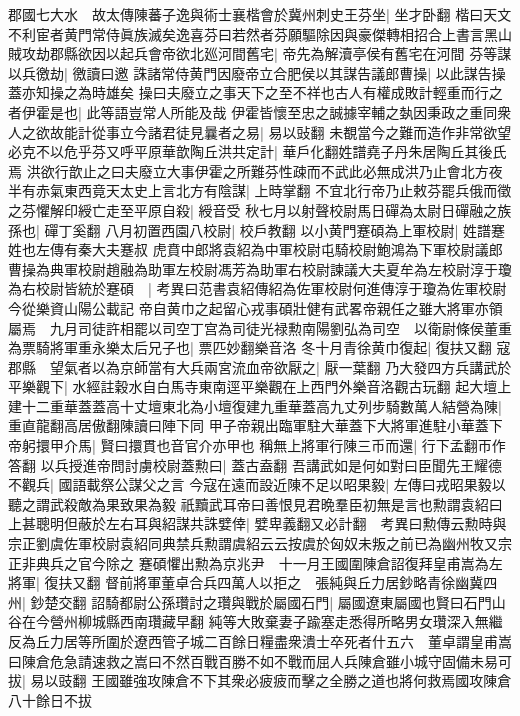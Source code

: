 郡國七大水　故太傳陳蕃子逸與術士襄楷會於冀州刺史王芬坐|{
	坐才卧翻}
楷曰天文不利宦者黄門常侍眞族滅矣逸喜芬曰若然者芬願驅除因與豪傑轉相招合上書言黑山賊攻劫郡縣欲因以起兵會帝欲北廵河間舊宅|{
	帝先為解瀆亭侯有舊宅在河間}
芬等謀以兵徼劫|{
	徼讀曰邀}
誅諸常侍黄門因廢帝立合肥侯以其謀告議郎曹操|{
	以此謀告操蓋亦知操之為時雄矣}
操曰夫廢立之事天下之至不祥也古人有權成敗計輕重而行之者伊霍是也|{
	此等語豈常人所能及哉}
伊霍皆懷至忠之誠據宰輔之埶因秉政之重同衆人之欲故能計從事立今諸君徒見曩者之易|{
	易以䜴翻}
未覩當今之難而造作非常欲望必克不以危乎芬又呼平原華歆陶丘洪共定計|{
	華戶化翻姓譜堯子丹朱居陶丘其後氏焉}
洪欲行歆止之曰夫廢立大事伊霍之所難芬性疎而不武此必無成洪乃止會北方夜半有赤氣東西竟天太史上言北方有陰謀|{
	上時掌翻}
不宜北行帝乃止敕芬罷兵俄而徵之芬懼解印綬亡走至平原自殺|{
	綬音受}
秋七月以射聲校尉馬日磾為太尉日磾融之族孫也|{
	磾丁奚翻}
八月初置西園八校尉|{
	校戶教翻}
以小黄門蹇碩為上軍校尉|{
	姓譜蹇姓也左傳有秦大夫蹇叔}
虎賁中郎將袁紹為中軍校尉屯騎校尉鮑鴻為下軍校尉議郎曹操為典軍校尉趙融為助軍左校尉馮芳為助軍右校尉諫議大夫夏牟為左校尉淳于瓊為右校尉皆統於蹇碩　|{
	考異曰范書袁紹傳紹為佐軍校尉何進傳淳于瓊為佐軍校尉今從樂資山陽公載記}
帝自黄巾之起留心戎事碩壯健有武畧帝親任之雖大將軍亦領屬焉　九月司徒許相罷以司空丁宫為司徒光禄勲南陽劉弘為司空　以衛尉條侯董重為票騎將軍重永樂太后兄子也|{
	票匹妙翻樂音洛}
冬十月青徐黄巾復起|{
	復扶又翻}
寇郡縣　望氣者以為京師當有大兵兩宮流血帝欲厭之|{
	厭一葉翻}
乃大發四方兵講武於平樂觀下|{
	水經註穀水自白馬寺東南逕平樂觀在上西門外樂音洛觀古玩翻}
起大壇上建十二重華蓋蓋高十丈壇東北為小壇復建九重華蓋高九丈列步騎數萬人結營為陳|{
	重直龍翻高居傲翻陳讀曰陣下同}
甲子帝親出臨軍駐大華蓋下大將軍進駐小華蓋下帝躬擐甲介馬|{
	賢曰擐貫也音官介亦甲也}
稱無上將軍行陳三币而還|{
	行下孟翻帀作答翻}
以兵授進帝問討虜校尉蓋勲曰|{
	蓋古盍翻}
吾講武如是何如對曰臣聞先王耀德不觀兵|{
	國語載祭公謀父之言}
今寇在遠而設近陳不足以昭果毅|{
	左傳曰戎昭果毅以聽之謂武殺敵為果致果為毅}
祇黷武耳帝曰善恨見君晩羣臣初無是言也勲謂袁紹曰上甚聰明但蔽於左右耳與紹謀共誅嬖倖|{
	嬖卑義翻又必計翻　考異曰勲傳云勲時與宗正劉虞佐軍校尉袁紹同典禁兵勲謂虞紹云云按虞於匈奴未叛之前已為幽州牧又宗正非典兵之官今除之}
蹇碩懼出勲為京兆尹　十一月王國圍陳倉詔復拜皇甫嵩為左將軍|{
	復扶又翻}
督前將軍董卓合兵四萬人以拒之　張純與丘力居鈔略青徐幽冀四州|{
	鈔楚交翻}
詔騎都尉公孫瓚討之瓚與戰於屬國石門|{
	屬國遼東屬國也賢曰石門山谷在今營州柳城縣西南瓚藏早翻}
純等大敗棄妻子踰塞走悉得所略男女瓚深入無繼反為丘力居等所圍於遼西管子城二百餘日糧盡衆潰士卒死者什五六　董卓謂皇甫嵩曰陳倉危急請速救之嵩曰不然百戰百勝不如不戰而屈人兵陳倉雖小城守固備未易可拔|{
	易以豉翻}
王國雖強攻陳倉不下其衆必疲疲而擊之全勝之道也將何救焉國攻陳倉八十餘日不拔

